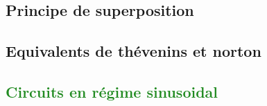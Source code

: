 \documentclass[11pt]{report}
\begin{document}
\section{Principe de superposition}
\begin{framed}

\end{framed}
\section{Equivalents de thévenins et norton}
\begin{framed}

\end{framed}

\textcolor{forestgreen}{\chapter{Circuits en régime sinusoidal}}
\end{document}
